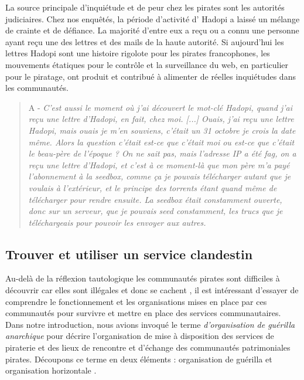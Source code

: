 La source principale d'inquiétude et de peur chez les pirates sont les autorités judiciaires. Chez nos enquêtés, la période d'activité d' Hadopi a laissé un mélange de crainte et de défiance. La majorité d'entre eux a reçu ou a connu une personne ayant reçu une des lettres et des mails de la haute autorité. Si aujourd'hui les lettres Hadopi sont une histoire rigolote pour les pirates francophones, les mouvements étatiques pour le contrôle et la surveillance du web, en particulier pour le piratage, ont produit et contribué à alimenter de réelles inquiétudes dans les communautés. 

\begin{quote}

A - \textit{C'est aussi le moment où j'ai découvert le mot-clé Hadopi, quand j'ai reçu une lettre d'Hadopi, en fait, chez moi. [...] Ouais, j'ai reçu une lettre Hadopi, mais ouais je m'en souviens, c'était un 31 octobre je crois la date même. Alors la question c'était est-ce que c'était moi ou est-ce que c'était le beau-père de l'époque ? On ne sait pas, mais l'adresse IP a été fag, on a reçu une lettre d'Hadopi, et c'est à ce moment-là que mon père m'a payé l'abonnement à la seedbox, comme ça je pouvais télécharger autant que je voulais à l'extérieur, et le principe des torrents étant quand même de télécharger pour rendre ensuite. La seedbox était constamment ouverte, donc sur un serveur, que je pouvais seed constamment, les trucs que je téléchargeais pour pouvoir les envoyer aux autres.}
    
\end{quote}

\subsection*{Trouver et utiliser un service clandestin}

Au-delà de la réflexion tautologique  \og les communautés pirates sont difficiles à découvrir car elles sont illégales et donc se cachent \fg, il est intéressant d'essayer de comprendre le fonctionnement et les organisations mises en place par ces communautés pour survivre et mettre en place des services communautaires. Dans notre introduction, nous avions invoqué le terme \textit{d'organisation de guérilla anarchique} pour décrire l'organisation de mise à disposition des services de piraterie et des lieux de rencontre et d'échange des communautés patrimoniales pirates. Découpons ce terme en deux éléments : \og organisation de guérilla \fg et \fg organisation horizontale \fg.

